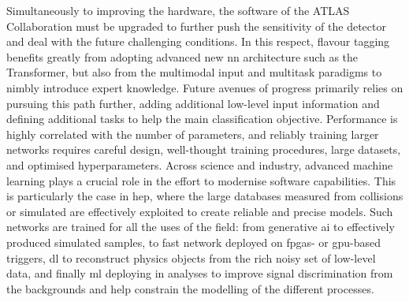 Simultaneously to improving the hardware, the software of the ATLAS Collaboration must be upgraded to further push the sensitivity of the detector and deal with the future challenging conditions. In this respect, flavour tagging benefits greatly from adopting advanced new \gls{nn} architecture such as the Transformer, but also from the multimodal input and multitask paradigms to nimbly introduce expert knowledge. Future avenues of progress primarily relies on pursuing this path further, adding additional low-level input information and defining additional tasks to help the main classification objective. Performance is highly correlated with the number of parameters, and reliably training larger networks requires careful design, well-thought training procedures, large datasets, and optimised hyperparameters. Across science and industry, advanced machine learning plays a crucial role in the effort to modernise software capabilities. This is particularly the case in \gls{hep}, where the large databases measured from collisions or simulated are effectively exploited to create reliable and precise models. Such networks are trained for all the uses of the field: from generative \gls{ai} to effectively produced simulated samples, to fast network deployed on \glspl{fpga}- or \gls{gpu}-based triggers, \gls{dl} to reconstruct physics objects from the rich noisy set of low-level data, and finally \gls{ml} deploying in analyses to improve signal discrimination from the backgrounds and help constrain the modelling of the different processes. 
